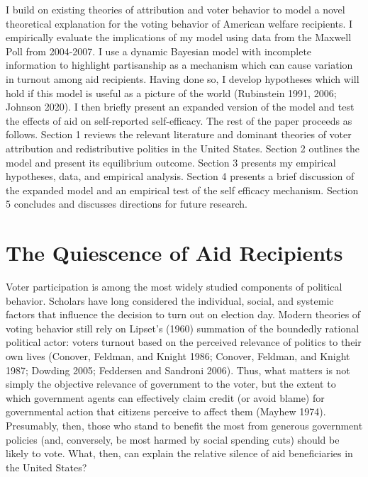 \documentclass[12pt]{paper}
\begin{document}
I build on existing theories of attribution and voter behavior to model a novel theoretical explanation for the voting behavior of American welfare recipients. I empirically evaluate the implications of my model using data from the Maxwell Poll from 2004-2007. I use a dynamic Bayesian model with incomplete information to highlight partisanship as a mechanism which can cause variation in turnout among aid recipients. Having done so, I develop hypotheses which will hold if this model is useful as a picture of the world (Rubinstein 1991, 2006; Johnson 2020). I then briefly present an expanded version of the model and test the effects of aid on self-reported self-efficacy. The rest of the paper proceeds as follows. Section 1 reviews the relevant literature and dominant theories of voter attribution and redistributive politics in the United States. Section 2 outlines the model and present its equilibrium outcome. Section 3 presents my empirical hypotheses, data, and empirical analysis. Section 4 presents a brief discussion of the expanded model and an empirical test of the self efficacy mechanism. Section 5 concludes and discusses directions for future research.


\section{The Quiescence of Aid Recipients}
Voter participation is among the most widely studied components of political behavior. Scholars have long considered the individual, social, and systemic factors that influence the decision to turn out on election day. Modern theories of voting behavior still rely on Lipset’s (1960) summation of the boundedly rational political actor: voters turnout based on the perceived relevance of politics to their own lives (Conover, Feldman, and Knight 1986; Conover, Feldman, and Knight 1987; Dowding 2005; Feddersen and Sandroni 2006). Thus, what matters is not simply the objective relevance of government to the voter, but the extent to which government agents can effectively claim credit (or avoid blame) for governmental action that citizens perceive to affect them (Mayhew 1974). Presumably, then, those who stand to benefit the most from generous government policies (and, conversely, be most harmed by social spending cuts) should be likely to vote. What, then, can explain the relative silence of aid beneficiaries in the United States?
\end{document}
